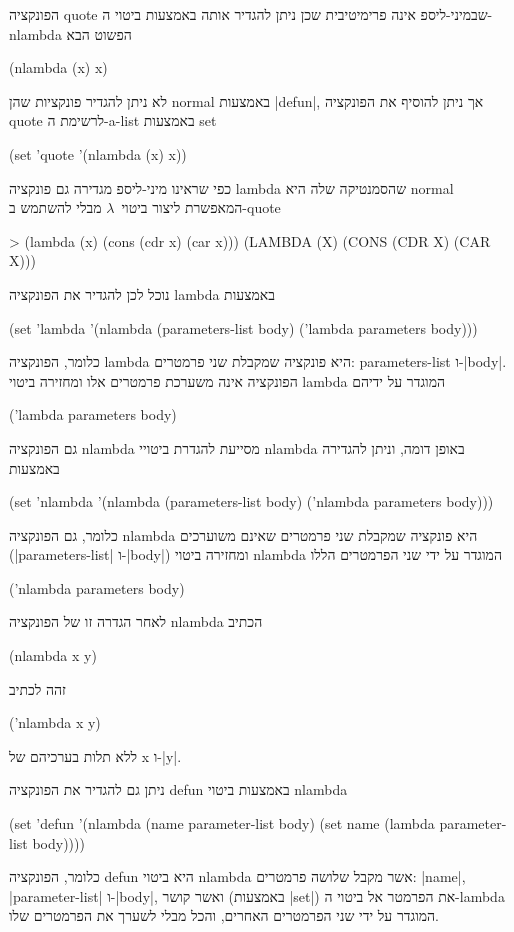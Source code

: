 הפונקציה quote שבמיני-ליספ אינה פרימיטיבית שכן ניתן להגדיר אותה באמצעות ביטוי
ה-nlambda הפשוט הבא
\begin{LISP}
(nlambda (x) x)
\end{LISP}
לא ניתן להגדיר פונקציות שהן normal באמצעות \E|defun|, אך ניתן להוסיף את הפונקציה
quote לרשימת ה-a-list באמצעות set
\begin{LIBRARY}
(set 'quote
  '(nlambda (x) x))
\end{LIBRARY}
כפי שראינו מיני-ליספ מגדירה גם פונקציה lambda שהסמנטיקה שלה היא normal המאפשרת
ליצור ביטוי~$λ$ מבלי להשתמש ב-quote
\begin{LISP}
> (lambda (x) (cons (cdr x) (car x)))
(LAMBDA (X) (CONS (CDR X) (CAR X)))
\end{LISP}
נוכל לכן להגדיר את הפונקציה lambda באמצעות
\begin{LIBRARY}
(set 'lambda
  '(nlambda (parameters-list body) ('lambda parameters body)))
\end{LIBRARY}
כלומר, הפונקציה lambda היא פונקציה שמקבלת שני פרמטרים: parameters-list
ו-\E|body|. הפונקציה אינה משערכת פרמטרים אלו ומחזירה ביטוי lambda המוגדר על ידיהם
\begin{LISP}
  ('lambda parameters body)
\end{LISP}
גם הפונקציה nlambda מסייעת להגדרת ביטויי nlambda באופן דומה, וניתן להגדירה
באמצעות
\begin{LIBRARY}
(set 'nlambda
  '(nlambda (parameters-list body) ('nlambda parameters body)))
\end{LIBRARY}
כלומר, גם הפונקציה nlambda היא פונקציה שמקבלת שני פרמטרים שאינם משוערכים
(\E|parameters-list| ו-\E|body|) ומחזירה ביטוי nlambda המוגדר על ידי
שני הפרמטרים הללו
\begin{LISP}
  ('nlambda parameters body)
\end{LISP}
לאחר הגדרה זו של הפונקציה nlambda הכתיב
\begin{LISP}
  (nlambda x y)
\end{LISP}
זהה לכתיב
\begin{LISP}
  ('nlambda x y)
\end{LISP}
ללא תלות בערכיהם של x ו-\E|y|.

ניתן גם להגדיר את הפונקציה defun באמצעות ביטוי nlambda
\begin{LIBRARY}
(set 'defun
  '(nlambda (name parameter-list body)
    (set name (lambda parameter-list body))))
\end{LIBRARY}
כלומר, הפונקציה defun היא ביטוי nlambda אשר מקבל שלושה פרמטרים: \E|name|,
\E|parameter-list| ו-\E|body|, ואשר קושר (באמצעות \E|set|) את הפרמטר אל ביטוי
ה-lambda המוגדר על ידי שני הפרמטרים האחרים, והכל מבלי לשערך את הפרמטרים שלו.

